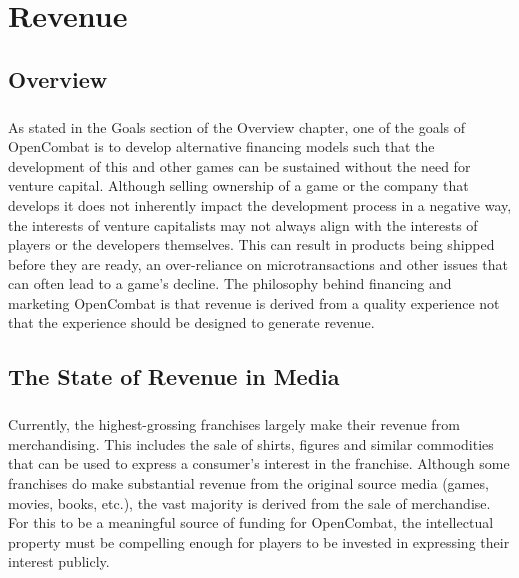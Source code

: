 \chapter{Revenue}

\section{Overview}

\paragraph{} As stated in the Goals section of the Overview chapter, one of the goals of OpenCombat is to develop alternative financing models such that the development of this and other games can be sustained without the need for venture capital. Although selling ownership of a game or the company that develops it does not inherently impact the development process in a negative way, the interests of venture capitalists may not always align with the interests of players or the developers themselves. This can result in products being shipped before they are ready, an over-reliance on microtransactions and other issues that can often lead to a game's decline. The philosophy behind financing and marketing OpenCombat is that revenue is derived from a quality experience not that the experience should be designed to generate revenue.

\section{The State of Revenue in Media}

\paragraph{} Currently, the highest-grossing franchises largely make their revenue from merchandising. This includes the sale of shirts, figures and similar commodities that can be used to express a consumer's interest in the franchise. Although some franchises do make substantial revenue from the original source media (games, movies, books, etc.), the vast majority is derived from the sale of merchandise. For this to be a meaningful source of funding for OpenCombat, the intellectual property must be compelling enough for players to be invested in expressing their interest publicly.

\pagebreak

